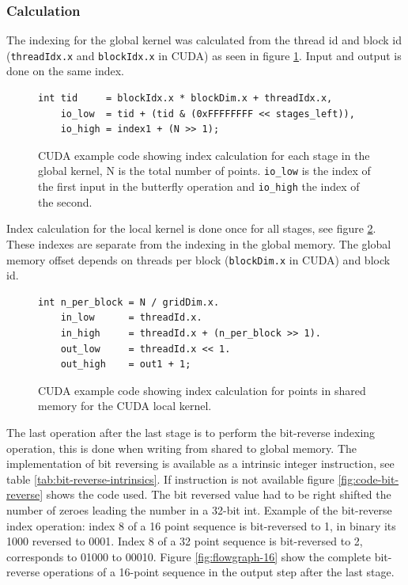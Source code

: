 \subsubsection{Calculation}

The indexing for the global kernel was calculated from the thread id and block id (\texttt{threadIdx.x} and \texttt{blockIdx.x} in CUDA) as seen in figure \ref{fig:code-global-index}. Input and output is done on the same index.
\begin{figure}[htbp]
	\centering
	\lstset{language=C++}
	\begin{framed}
	\begin{lstlisting}
int tid     = blockIdx.x * blockDim.x + threadIdx.x,
    io_low  = tid + (tid & (0xFFFFFFFF << stages_left)),
    io_high = index1 + (N >> 1);
	\end{lstlisting}
	\end{framed}
	\caption{ CUDA example code showing index calculation for each stage in the global kernel, N is the total number of points. \texttt{io\_low} is the index of the first input in the butterfly operation and \texttt{io\_high} the index of the second.}
	\label{fig:code-global-index}
\end{figure}

Index calculation for the local kernel is done once for all stages, see figure \ref{fig:code-local-index}. These indexes are separate from the indexing in the global memory. The global memory offset depends on threads per block (\texttt{blockDim.x} in CUDA) and block id.
\begin{figure}[htbp]
	\centering
	\lstset{language=C++}
	\begin{framed}
	\begin{lstlisting}
int n_per_block = N / gridDim.x.
    in_low      = threadId.x.
    in_high     = threadId.x + (n_per_block >> 1).
    out_low     = threadId.x << 1.
    out_high    = out1 + 1;
	\end{lstlisting}
	\end{framed}
	\caption{ CUDA example code showing index calculation for points in shared memory for the CUDA local kernel. }
	\label{fig:code-local-index}
\end{figure}

The last operation after the last stage is to perform the bit-reverse indexing operation, this is done when writing from shared to global memory. The implementation of bit reversing is available as a intrinsic integer instruction, see table \ref{tab:bit-reverse-intrinsics}. If instruction is not available figure \ref{fig:code-bit-reverse} shows the code used. The bit reversed value had to be right shifted the number of zeroes leading the number in a 32-bit int. Example of the bit-reverse index operation: index 8 of a 16 point sequence is bit-reversed to 1, in binary its 1000 reversed to 0001. Index 8 of a 32 point sequence is bit-reversed to 2, corresponds to 01000 to 00010. Figure \ref{fig:flowgraph-16} show the complete bit-reverse operations of a 16-point sequence in the output step after the last stage.

